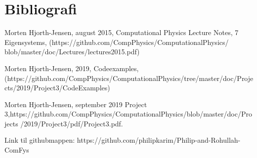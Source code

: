 \documentclass[%
oneside,                 %
final,                   %
10pt]{article}
\begin{document}
\section{Bibliografi}
\noindent [1] Morten Hjorth-Jensen, august 2015, Computational Physics Lecture Notes, 7 Eigensystems,
(https://github.com/CompPhysics/ComputationalPhysics/
blob/master/doc/Lectures/lectures2015.pdf)\newline

\noindent [2] Morten Hjorth-Jensen, 2019, Codeexamples,\newline
(https://github.com/CompPhysics/ComputationalPhysics/tree/master/doc/Projects/2019/Project3/CodeExamples)\newline

\noindent [3] Morten Hjorth-Jensen, september 2019 Project 3,\newline https://github.com/CompPhysics/ComputationalPhysics/blob/master/doc/Projects\newline
/2019/Project3/pdf/Project3.pdf.\newline


\noindent Link til githubmappen: https://github.com/philipkarim/Philip-and-Rohullah-ComFys




\end{document}
